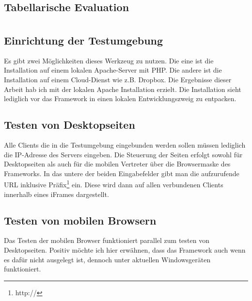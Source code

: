	\subsection{Tabellarische Evaluation}


	\pagebreak			
	\section{}
		\subsection {Einrichtung der Testumgebung}
		Es gibt zwei Möglichkeiten dieses Werkzeug zu nutzen. Die eine ist die Installation auf einem lokalen Apache-Server mit 			PHP. Die andere ist die Installation auf einem Cloud-Dienst wie z.B. Dropbox. Die Ergebnisse dieser Arbeit hab ich mit der 		lokalen Apache Installation erzielt. Die Installation sieht lediglich vor das Framework in einen lokalen Entwicklungszweig zu 		entpacken.
		
		\subsection{Testen von Desktopseiten}
		Alle Clients die in die Testumgebung eingebunden werden sollen müssen lediglich die IP-Adresse des Servers eingeben.
		Die Steuerung der Seiten erfolgt sowohl für Desktopseiten als auch für die mobilen Vertreter über die Browsermaske des 			Frameworks. In das untere der beiden Eingabefelder gibt man die aufzurufende URL inklusive Präfix\footnote{http://} ein. 			Diese wird dann auf allen verbundenen Clients innerhalb eines iFrames dargestellt. 
				
		 \subsection{Testen von mobilen Browsern}
		 Das Testen der mobilen Browser funktioniert parallel zum testen von Desktopseiten. Positiv möchte ich hier erwähnen, 			dass das Framework auch wenn es dafür nicht ausgelegt ist, dennoch unter aktuellen Windowsgeräten funktioniert.			
		

